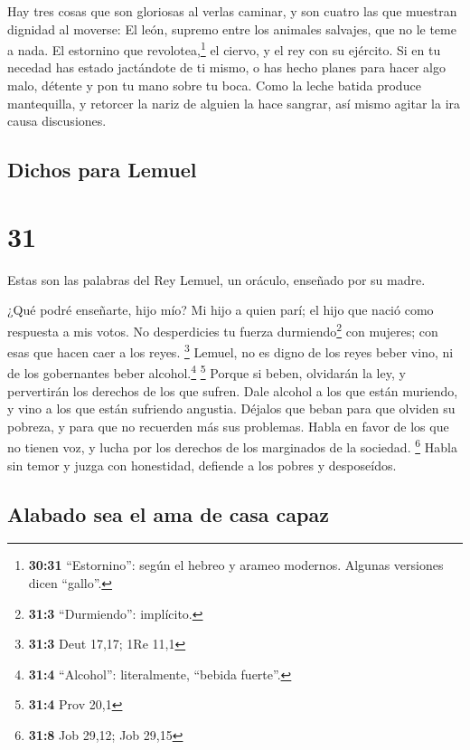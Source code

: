  Hay tres cosas que son gloriosas al verlas caminar, y
son cuatro las que muestran dignidad al moverse:  El
león, supremo entre los animales salvajes, que no le teme a nada.
 El estornino que revolotea,\footnote{\textbf{30:31}
  ``Estornino'': según el hebreo y arameo modernos. Algunas versiones
  dicen ``gallo''.} el ciervo, y el rey con su ejército. 
Si en tu necedad has estado jactándote de ti mismo, o has hecho planes
para hacer algo malo, détente y pon tu mano sobre tu boca.
 Como la leche batida produce mantequilla, y retorcer la
nariz de alguien la hace sangrar, así mismo agitar la ira causa
discusiones.

\hypertarget{dichos-para-lemuel}{%
\subsection{Dichos para Lemuel}\label{dichos-para-lemuel}}

\hypertarget{section-30}{%
\section{31}\label{section-30}}

 Estas son las palabras del Rey Lemuel, un oráculo,
enseñado por su madre.

 ¿Qué podré enseñarte, hijo mío? Mi hijo a quien parí; el
hijo que nació como respuesta a mis votos.  No
desperdicies tu fuerza durmiendo\footnote{\textbf{31:3} ``Durmiendo'':
  implícito.} con mujeres; con esas que hacen caer a los reyes.
\footnote{\textbf{31:3} Deut 17,17; 1Re 11,1}  Lemuel, no
es digno de los reyes beber vino, ni de los gobernantes beber
alcohol.\footnote{\textbf{31:4} ``Alcohol'': literalmente, ``bebida
  fuerte''.} \footnote{\textbf{31:4} Prov 20,1}  Porque si
beben, olvidarán la ley, y pervertirán los derechos de los que sufren.
 Dale alcohol a los que están muriendo, y vino a los que
están sufriendo angustia.  Déjalos que beban para que
olviden su pobreza, y para que no recuerden más sus problemas.
 Habla en favor de los que no tienen voz, y lucha por los
derechos de los marginados de la sociedad. \footnote{\textbf{31:8} Job
  29,12; Job 29,15}  Habla sin temor y juzga con
honestidad, defiende a los pobres y desposeídos.

\hypertarget{alabado-sea-el-ama-de-casa-capaz}{%
\subsection{Alabado sea el ama de casa
capaz}\label{alabado-sea-el-ama-de-casa-capaz}}

